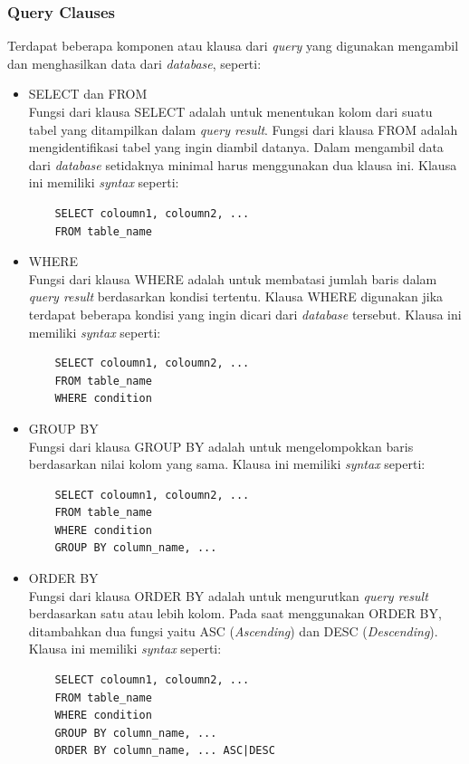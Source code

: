 \subsubsection{Query Clauses}
Terdapat beberapa komponen atau klausa dari \textit{query} yang digunakan mengambil dan menghasilkan data dari \textit{database}, seperti:
\begin{itemize}
    \item SELECT dan FROM\\
    Fungsi dari klausa SELECT adalah untuk menentukan kolom dari suatu tabel yang ditampilkan dalam \textit{query result}. Fungsi dari klausa FROM adalah mengidentifikasi tabel yang ingin diambil datanya. Dalam mengambil data dari \textit{database} setidaknya minimal harus menggunakan dua klausa ini. Klausa ini memiliki \textit{syntax} seperti:
    \begin{verbatim}
    SELECT coloumn1, coloumn2, ...
    FROM table_name
    \end{verbatim}
    
    \item WHERE\\
    Fungsi dari klausa WHERE adalah untuk membatasi jumlah baris dalam \textit{query result} berdasarkan kondisi tertentu. Klausa WHERE digunakan jika terdapat beberapa kondisi yang ingin dicari dari \textit{database} tersebut. Klausa ini memiliki \textit{syntax} seperti:
    \begin{verbatim}
    SELECT coloumn1, coloumn2, ...
    FROM table_name
    WHERE condition
\end{verbatim}
    
    \item GROUP BY\\
    Fungsi dari klausa GROUP BY adalah untuk mengelompokkan baris berdasarkan nilai kolom yang sama. Klausa ini memiliki \textit{syntax} seperti:
    \begin{verbatim}
    SELECT coloumn1, coloumn2, ...
    FROM table_name
    WHERE condition
    GROUP BY column_name, ...
\end{verbatim}
    
    \item ORDER BY\\
    Fungsi dari klausa ORDER BY adalah untuk mengurutkan \textit{query result} berdasarkan satu atau lebih kolom. Pada saat menggunakan ORDER BY, ditambahkan dua fungsi yaitu ASC (\textit{Ascending}) dan DESC (\textit{Descending}). Klausa ini memiliki \textit{syntax} seperti:
    \begin{verbatim}
    SELECT coloumn1, coloumn2, ...
    FROM table_name
    WHERE condition
    GROUP BY column_name, ...
    ORDER BY column_name, ... ASC|DESC
\end{verbatim}
\end{itemize}



